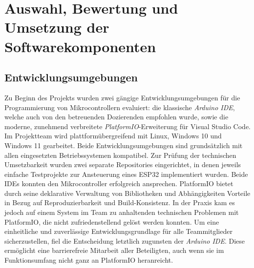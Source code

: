 \chapter{Auswahl, Bewertung und Umsetzung der Softwarekomponenten}

\section{Entwicklungsumgebungen}

Zu Beginn des Projekts wurden zwei gängige Entwicklungsumgebungen für die Programmierung von Mikrocontrollern evaluiert: die klassische \textit{Arduino IDE}, welche auch von den betreuenden Dozierenden empfohlen wurde, sowie die moderne, zunehmend verbreitete \textit{PlatformIO}-Erweiterung für Visual Studio Code.
Im Projektteam wird plattformübergreifend mit Linux, Windows 10 und Windows 11 gearbeitet. Beide Entwicklungsumgebungen sind grundsätzlich mit allen eingesetzten Betriebssystemen kompatibel. Zur Prüfung der technischen Umsetzbarkeit wurden zwei separate Repositories eingerichtet, in denen jeweils einfache Testprojekte zur Ansteuerung eines ESP32 implementiert wurden.
Beide IDEs konnten den Mikrocontroller erfolgreich ansprechen. PlatformIO bietet durch seine deklarative Verwaltung von Bibliotheken und Abhängigkeiten Vorteile in Bezug auf Reproduzierbarkeit und Build-Konsistenz. In der Praxis kam es jedoch auf einem System im Team zu anhaltenden technischen Problemen mit PlatformIO, die nicht zufriedenstellend gelöst werden konnten.
Um eine einheitliche und zuverlässige Entwicklungsgrundlage für alle Teammitglieder sicherzustellen, fiel die Entscheidung letztlich zugunsten der \textit{Arduino IDE}. Diese ermöglicht eine barrierefreie Mitarbeit aller Beteiligten, auch wenn sie im Funktionsumfang nicht ganz an PlatformIO heranreicht.


